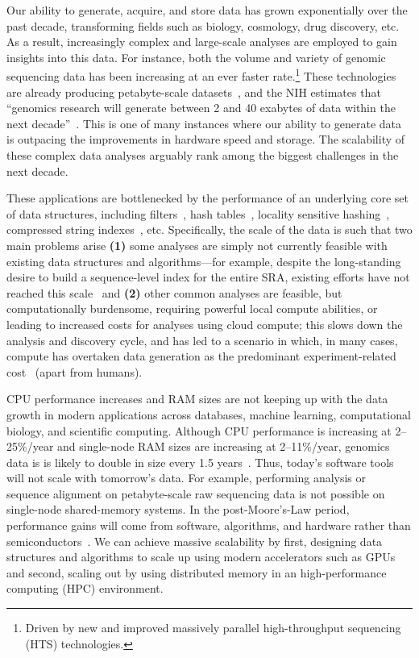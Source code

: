 Our ability to generate, acquire, and store data has grown exponentially over
the past decade, transforming fields such as biology, cosmology, drug discovery,
etc.  
As a result, increasingly complex and large-scale analyses are employed to
gain insights into this data.  
For instance, both the volume and variety of genomic sequencing data has been
increasing at an ever faster rate.\footnote{Driven by new and improved massively parallel
high-throughput sequencing (HTS) technologies.}  These technologies are already
producing petabyte-scale datasets~\cite{kodama2012sequence}, and the NIH
estimates that ``genomics research will generate between 2 and 40 exabytes of
data within the next decade''~\cite{NHGRIDataScience}. This is one of many instances where our ability to generate data is outpacing the improvements in hardware speed and storage.
The scalability of these complex data
analyses arguably rank among the biggest challenges in the next decade. 




These applications are bottlenecked by the performance of an underlying core set
of data structures, including filters~\cite{PandeyAlBe18, solomon2016fast}, hash
tables~\cite{solomon2016fast,almodaresi2022incrementally}, locality sensitive
hashing~\cite{Marais2019}, compressed string
indexes~\cite{Almodaresi2018Pufferfish}, etc. Specifically, the scale of the
data is such that two main problems arise \textbf{(1)} some analyses are simply
not currently feasible with existing data structures and algorithms---for
example, despite the long-standing desire to build a sequence-level index for
the entire SRA, existing efforts have not reached this
scale~\cite{Karasikov2020, HarrisM20, SolomonK17, almodaresi2022incrementally,
AlmodaresiPFJP20,PandeyAlBe18} and \textbf{(2)} other common analyses are
feasible, but computationally burdensome, requiring powerful local compute
abilities, or leading to increased costs for analyses using cloud compute; this
slows down the analysis and discovery cycle, and has led to a scenario in which,
in many cases, compute has overtaken data generation as the predominant
experiment-related cost~\cite{Muir_2016} (apart from humans).

CPU performance increases and RAM sizes are not keeping up with the data growth in modern
applications across databases, machine learning, computational biology, and
scientific computing. Although CPU performance is increasing at 2--25\%/year and
single-node RAM sizes are increasing at 2--11\%/year, genomics data is is likely
to double in size every 1.5 years~\cite{kodama2012sequence}. Thus, today's
software tools will not scale with tomorrow's data. For example, performing
\kmer analysis or sequence alignment on petabyte-scale raw sequencing data is
not possible on single-node shared-memory systems.
In the post-Moore’s-Law period, performance gains will come from software,
algorithms, and hardware rather than semiconductors~\cite{leiserson2020there}.
We can achieve massive scalability by first, designing data structures and
algorithms to scale up using modern accelerators such as GPUs and second,
scaling out by using distributed memory in an high-performance computing (HPC)
environment.


